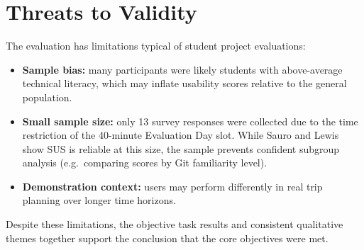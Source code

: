 \section{Threats to Validity}
The evaluation has limitations typical of student project evaluations:
\begin{itemize}
  \item \textbf{Sample bias:} many participants were likely students with
        above-average technical literacy, which may inflate usability scores
        relative to the general population.
  \item \textbf{Small sample size:} only 13 survey responses were collected due
        to the time restriction of the 40-minute Evaluation Day slot. While
        Sauro and Lewis~\cite{ref_sauro_lewis_sus} show SUS is reliable at this
        size, the sample prevents confident subgroup analysis (e.g.\ comparing
        scores by Git familiarity level).
  \item \textbf{Demonstration context:} users may perform differently in real
        trip planning over longer time horizons.
\end{itemize}

Despite these limitations, the objective task results and consistent qualitative
themes together support the conclusion that the core objectives were met.

